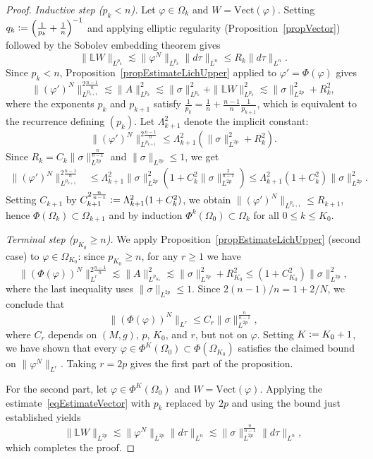 \documentclass[a4paper, 10pt, reqno]{amsart}
\theoremstyle{plain}
\theoremstyle{remark}
\theoremstyle{definition}
\renewcommand{\phi}{\varphi}
\newcommand{\bL}{\mathbb{L}}
\newcommand{\definedas}{\mathrel{\raise.095ex\hbox{\rm :}\mkern-5.2mu=}}
\begin{document}
\begin{proof}
	\medskip\noindent\textit{Inductive step ($p_k < n$).}
	Let $\phi \in \Omega_k$ and $W = \mathrm{Vect}(\phi)$. Setting $q_k \definedas
		\left(\frac{1}{p_k}+\frac{1}{n}\right)^{-1}$ and applying elliptic regularity
	(Proposition~\ref{propVector}) followed by the Sobolev embedding theorem gives
	\begin{equation}\label{eqEstimateVector}
		\|\bL W\|_{L^{p_k}} \lesssim \|\phi^N\|_{L^{p_k}} \|d\tau\|_{L^n} \leq R_k \|d\tau\|_{L^n}.
	\end{equation}
	Since $p_k < n$, Proposition~\ref{propEstimateLichUpper} applied to $\phi' =
		\Phi(\phi)$ gives
	\[
		\|(\phi')^N\|_{L^{p_{k+1}}}^{2\frac{n-1}{n}}
		\lesssim \|A\|_{L^{p_k}}^2
		\lesssim \|\sigma\|_{L^{p_k}}^2 + \|\bL W\|_{L^{p_k}}^2
		\lesssim \|\sigma\|_{L^{2p}}^2 + R_k^2,
	\]
	where the exponents $p_k$ and $p_{k+1}$ satisfy $\frac{1}{p_k} = \frac{1}{n} +
		\frac{n-1}{n} \frac{1}{p_{k+1}}$, which is equivalent to the recurrence
	defining $(p_k)$. Let $\Lambda_{k+1}^2$ denote the implicit constant:
	\[
		\|(\phi')^N\|_{L^{p_{k+1}}}^{2\frac{n-1}{n}}
		\leq \Lambda_{k+1}^2 \left(\|\sigma\|_{L^{2p}}^2 + R_k^2\right).
	\]
	Since $R_k = C_k \|\sigma\|_{L^{2p}}^{\frac{n}{n-1}}$ and $\|\sigma\|_{L^{2p}}
		\leq 1$, we get
	\begin{align*}
		\|(\phi')^N\|_{L^{p_{k+1}}}^{2\frac{n-1}{n}}
		 & \leq \Lambda_{k+1}^2 \|\sigma\|_{L^{2p}}^2 \left(1 + C_k^2 \|\sigma\|_{L^{2p}}^{\frac{2}{n-1}}\right)
		\leq \Lambda_{k+1}^2 \left(1 + C_k^2\right) \|\sigma\|_{L^{2p}}^2.
	\end{align*}
	Setting $C_{k+1}$ by $C_{k+1}^{2\frac{n}{n-1}} \definedas \Lambda_{k+1}^2 (1 + C_k^2)$, we
	obtain $\|(\phi')^N\|_{L^{p_{k+1}}} \leq R_{k+1}$, hence $\Phi(\Omega_k) \subset
		\Omega_{k+1}$ and by induction $\Phi^k(\Omega_0) \subset \Omega_k$ for all
	$0 \leq k \leq K_0$.

	\medskip\noindent\textit{Terminal step ($p_{K_0} \geq n$).}
	We apply Proposition~\ref{propEstimateLichUpper} (second case) to
	$\phi \in \Omega_{K_0}$: since $p_{K_0} \geq n$, for any $r \geq 1$ we have
	\[
		\|(\Phi(\phi))^N\|_{L^r}^{2\frac{n-1}{n}}
		\lesssim \|A\|_{L^{p_{K_0}}}^2
		\lesssim \|\sigma\|_{L^{2p}}^2 + R_{K_0}^2
		\leq (1 + C_{K_0}^2)\|\sigma\|_{L^{2p}}^2,
	\]
	where the last inequality uses $\|\sigma\|_{L^{2p}} \leq 1$. Since $2(n-1)/n =
		1 + 2/N$, we conclude that
	\[
		\|(\Phi(\phi))^N\|_{L^r} \leq C_r \|\sigma\|_{L^{2p}}^{\frac{n}{n-1}},
	\]
	where $C_r$ depends on $(M, g)$, $p$, $K_0$, and $r$, but not on $\phi$.
	Setting $K \definedas K_0 + 1$, we have shown that every $\phi \in
		\Phi^K(\Omega_0) \subset \Phi(\Omega_{K_0})$ satisfies the claimed bound on
	$\|\phi^N\|_{L^r}$. Taking $r = 2p$ gives the first part of the proposition.

	\medskip

	For the second part, let $\phi \in \Phi^K(\Omega_0)$ and $W =
		\mathrm{Vect}(\phi)$. Applying the estimate~\eqref{eqEstimateVector} with $p_k$
	replaced by $2p$ and using the bound just established yields
	\[
		\|\bL W\|_{L^{2p}} \lesssim \|\phi^N\|_{L^{2p}} \|d\tau\|_{L^n}
		\lesssim \|\sigma\|_{L^{2p}}^{\frac{n}{n-1}} \|d\tau\|_{L^n},
	\]
	which completes the proof.
\end{proof}
\end{document}
